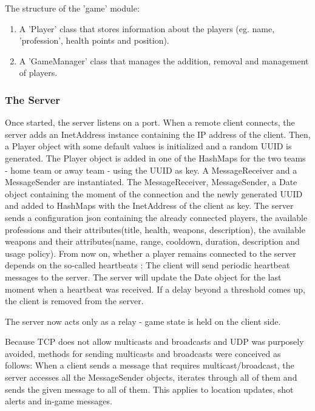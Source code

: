 \documentclass{article}
\begin{document}
The structure of the 'game' module:

\begin{enumerate}
  
  \item A 'Player' class that stores information about the players (eg. name,
  'profession', health points and position).
  
  \item A 'GameManager' class that manages the addition, removal and management
  of players.
  
\end{enumerate}

\subsubsection{The Server}

Once started, the server listens on a port. When a remote client connects, the
server adds an InetAddress instance containing the IP address of the client.
Then, a Player object with some default values is initialized and a random UUID
is generated. The Player object is added in one of the HashMaps for the two
teams - home team or away team - using the UUID as key. A MessageReceiver and a
MessageSender are instantiated. The MessageReceiver, MessageSender, a Date
object containing the moment of the connection and the newly generated UUID and
added to HashMaps with the InetAddress of the client as key. The server sends a
configuration json containing the already connected players, the available
professions and their attributes(title, health, weapons, description), the
available weapons and their attributes(name, range, cooldown, duration,
description and usage policy). From now on, whether a player remains connected
to the server depends on the so-called heartbeats : The client will send
periodic heartbeat messages to the server. The server will update the Date
object for the last moment when a heartbeat was received. If a delay beyond a
threshold comes up, the client is removed from the server.\newline

The server now acts only as a relay - game state is held on the client
side.\newline

Because TCP does not allow multicasts and broadcasts and UDP was purposely
avoided, methods for sending multicasts and broadcasts were conceived as
follows: When a client sends a message that requires multicast/broadcast, the
server accesses all the MessageSender objects, iterates through all of them and
sends the given message to all of them. This applies to location updates, shot
alerts and in-game messages.\newline
\end{document}
